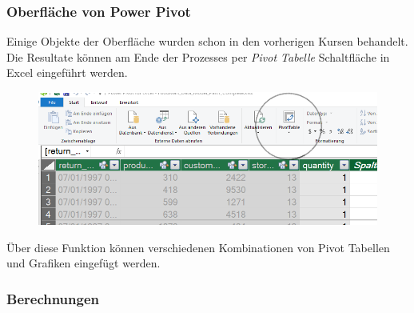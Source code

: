 \subsubsection{Oberfläche von Power Pivot}
Einige Objekte der Oberfläche wurden schon in den vorherigen Kursen behandelt. Die Resultate können am Ende der Prozesses per \textit{Pivot Tabelle} Schaltfläche in Excel eingeführt werden. 
\begin{figure}[H]
	\centering
	\includegraphics[scale = 0.3]{attachment/chapter_1/screenshot073}
	\caption{}
	\label{fig:screenshot073}
\end{figure}
Über diese Funktion können verschiedenen Kombinationen von Pivot Tabellen und Grafiken eingefügt werden. 
\subsubsection{Berechnungen}
